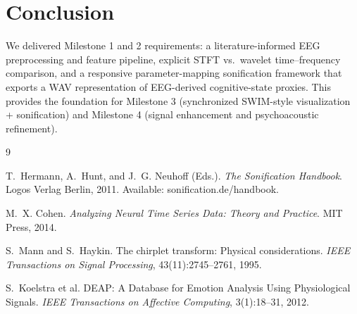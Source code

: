 \documentclass[11pt]{article}
\begin{document}
\section{Conclusion}
We delivered Milestone 1 and 2 requirements: a literature-informed EEG preprocessing and feature pipeline, explicit STFT vs.\ wavelet time--frequency comparison, and a responsive parameter-mapping sonification framework that exports a WAV representation of EEG-derived cognitive-state proxies. This provides the foundation for Milestone 3 (synchronized SWIM-style visualization + sonification) and Milestone 4 (signal enhancement and psychoacoustic refinement).

\begin{thebibliography}{9}

T.~Hermann, A.~Hunt, and J.~G. Neuhoff (Eds.).
\newblock \emph{The Sonification Handbook}.
\newblock Logos Verlag Berlin, 2011. Available: sonification.de/handbook.

M.~X. Cohen.
\newblock \emph{Analyzing Neural Time Series Data: Theory and Practice}.
\newblock MIT Press, 2014.

S.~Mann and S.~Haykin.
\newblock The chirplet transform: Physical considerations.
\newblock \emph{IEEE Transactions on Signal Processing}, 43(11):2745--2761, 1995.

S.~Koelstra et al.
\newblock DEAP: A Database for Emotion Analysis Using Physiological Signals.
\newblock \emph{IEEE Transactions on Affective Computing}, 3(1):18--31, 2012.

\end{thebibliography}
\end{document}

